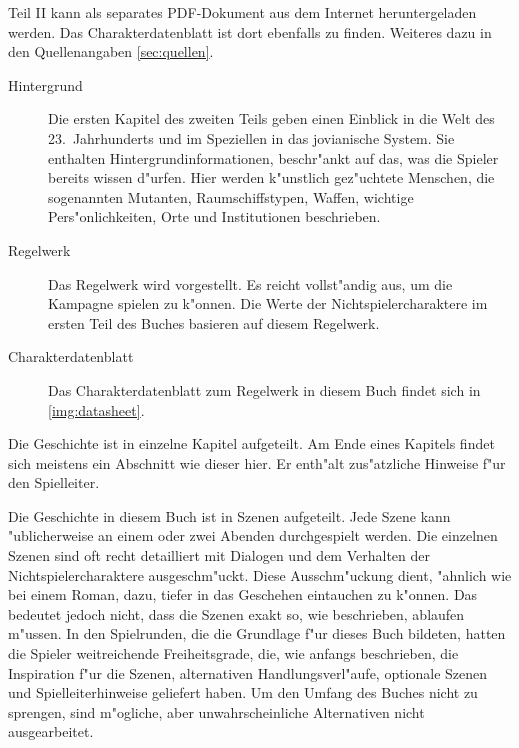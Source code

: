 \begin{description}
        Teil II kann als separates PDF-Dokument aus dem Internet heruntergeladen werden. Das Charakterdatenblatt ist dort ebenfalls zu finden. Weiteres dazu in den Quellenangaben \cref{sec:quellen}.
        \begin{description}
            \item [Hintergrund] Die ersten Kapitel des zweiten Teils  geben einen Einblick in die Welt des 
                23.~Jahrhunderts und im Speziellen in das jovianische System. Sie enthalten Hintergrundinformationen, beschr"ankt auf das, was die Spieler bereits wissen d"urfen. Hier werden k"unstlich gez"uchtete Menschen, die sogenannten Mutanten, Raumschiffstypen, Waffen, wichtige Pers"onlichkeiten, Orte und Institutionen beschrieben.
            \item [Regelwerk] Das Regelwerk wird  vorgestellt. Es reicht vollst"andig aus, um die Kampagne 
                spielen zu k"onnen. Die Werte der Nichtspielercharaktere im ersten Teil des Buches basieren auf diesem Regelwerk.
            \item [Charakterdatenblatt] Das Charakterdatenblatt zum Regelwerk in diesem Buch findet sich in \cref{img:datasheet}.
        \end{description}        
\end{description}


\begin{remarks}
    Die Geschichte ist in einzelne Kapitel aufgeteilt. Am Ende eines Kapitels findet sich meistens ein Abschnitt wie dieser hier. Er enth"alt zus"atzliche Hinweise f"ur den Spielleiter.
\end{remarks}


Die Geschichte in diesem Buch ist in Szenen aufgeteilt. Jede Szene kann "ublicherweise an einem oder zwei Abenden durchgespielt werden. Die einzelnen Szenen sind oft recht detailliert mit Dialogen und dem Verhalten der Nichtspielercharaktere ausgeschm"uckt. Diese Ausschm"uckung dient, "ahnlich wie bei einem Roman, dazu, tiefer in das Geschehen eintauchen zu k"onnen. Das bedeutet jedoch nicht, dass die Szenen exakt so, wie beschrieben, ablaufen m"ussen. In den Spielrunden, die die Grundlage f"ur dieses Buch bildeten, hatten die Spieler weitreichende Freiheitsgrade, die, wie anfangs beschrieben, die Inspiration f"ur die Szenen, alternativen Handlungsverl"aufe, optionale Szenen und Spielleiterhinweise geliefert haben. Um den Umfang des Buches nicht zu sprengen, sind m"ogliche, aber unwahrscheinliche Alternativen nicht ausgearbeitet.

